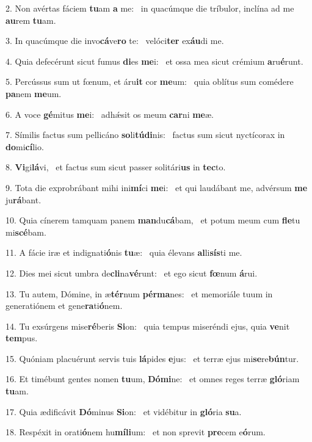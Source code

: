 2. Non avértas fáciem \textbf{tu}am \textbf{a} me: \ast\  in quacúmque die tríbulor, inclína ad me \textbf{au}rem \textbf{tu}am.\

3. In quacúmque die invo\textbf{cá}ve\textbf{ro} te: \ast\  velóci\textbf{ter} ex\textbf{áu}di me.\

4. Quia defecérunt sicut fumus \textbf{di}es \textbf{me}i: \ast\  et ossa mea sicut crémium \textbf{a}ru\textbf{é}runt.\

5. Percússus sum ut fœnum, et áru\textbf{it} cor \textbf{me}um: \ast\  quia oblítus sum comédere \textbf{pa}nem \textbf{me}um.\

6. A voce \textbf{gé}mitus \textbf{me}i: \ast\  adhǽsit os meum \textbf{car}ni \textbf{me}æ.\

7. Símilis factus sum pellicáno \textbf{so}li\textbf{tú}\textbf{di}nis: \ast\  factus sum sicut nyctícorax in \textbf{do}mi\textbf{cí}lio.\

8. \textbf{Vi}gi\textbf{lá}vi, \ast\  et factus sum sicut passer solitári\textbf{us} in \textbf{tec}to.\

9. Tota die exprobrábant mihi ini\textbf{mí}ci \textbf{me}i: \ast\  et qui laudábant me, advérsum \textbf{me} ju\textbf{rá}bant.\

10. Quia cínerem tamquam panem \textbf{man}du\textbf{cá}bam, \ast\  et potum meum cum \textbf{fle}tu mi\textbf{scé}bam.\

11. A fácie iræ et indignati\textbf{ó}nis \textbf{tu}æ: \ast\  quia élevans \textbf{al}li\textbf{sís}ti me.\

12. Dies mei sicut umbra de\textbf{cli}na\textbf{vé}runt: \ast\  et ego sicut \textbf{fœ}num \textbf{á}rui.\

13. Tu autem, Dómine, in æ\textbf{tér}num \textbf{pér}\textbf{ma}nes: \ast\  et memoriále tuum in generatiónem et gene\textbf{ra}ti\textbf{ó}nem.\

14. Tu exsúrgens mise\textbf{ré}beris \textbf{Si}on: \ast\  quia tempus miseréndi ejus, quia \textbf{ve}nit \textbf{tem}pus.\

15. Quóniam placuérunt servis tuis \textbf{lá}pides \textbf{e}jus: \ast\  et terræ ejus mi\textbf{se}re\textbf{bún}tur.\

16. Et timébunt gentes nomen \textbf{tu}um, \textbf{Dó}\textbf{mi}ne: \ast\  et omnes reges terræ \textbf{gló}riam \textbf{tu}am.\

17. Quia ædificávit \textbf{Dó}minus \textbf{Si}on: \ast\  et vidébitur in \textbf{gló}ria \textbf{su}a.\

18. Respéxit in orati\textbf{ó}nem hu\textbf{mí}\textbf{li}um: \ast\  et non sprevit \textbf{pre}cem e\textbf{ó}rum.\

